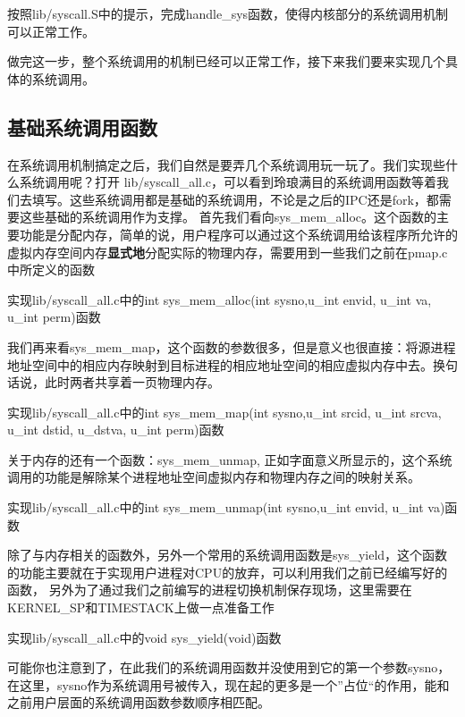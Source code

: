 \begin{exercise}
按照lib/syscall.S中的提示，完成handle\_sys函数，使得内核部分的系统调用机制可以正常工作。
\end{exercise}

做完这一步，整个系统调用的机制已经可以正常工作，接下来我们要来实现几个具体的系统调用。

\subsection{基础系统调用函数}

在系统调用机制搞定之后，我们自然是要弄几个系统调用玩一玩了。我们实现些什么系统调用呢？打开 lib/syscall\_all.c，可以看到玲琅满目的系统调用函数等着我们去填写。这些系统调用都是基础的系统调用，不论是之后的IPC还是fork，都需要这些基础的系统调用作为支撑。
首先我们看向sys\_mem\_alloc。这个函数的主要功能是分配内存，简单的说，用户程序可以通过这个系统调用给该程序所允许的虚拟内存空间内存\textbf{显式地}分配实际的物理内存，需要用到一些我们之前在pmap.c中所定义的函数
\begin{exercise}
实现lib/syscall\_all.c中的int sys\_mem\_alloc(int sysno,u\_int envid, u\_int va, u\_int perm)函数
\end{exercise}
我们再来看sys\_mem\_map，这个函数的参数很多，但是意义也很直接：将源进程地址空间中的相应内存映射到目标进程的相应地址空间的相应虚拟内存中去。换句话说，此时两者共享着一页物理内存。
\begin{exercise}
实现lib/syscall\_all.c中的int sys\_mem\_map(int sysno,u\_int srcid, u\_int srcva, u\_int dstid, u\_dstva, u\_int perm)函数
\end{exercise}
关于内存的还有一个函数：sys\_mem\_unmap, 正如字面意义所显示的，这个系统调用的功能是解除某个进程地址空间虚拟内存和物理内存之间的映射关系。
\begin{exercise}
实现lib/syscall\_all.c中的int sys\_mem\_unmap(int sysno,u\_int envid, u\_int va)函数
\end{exercise}
除了与内存相关的函数外，另外一个常用的系统调用函数是sys\_yield，这个函数的功能主要就在于实现用户进程对CPU的放弃，可以利用我们之前已经编写好的函数，
另外为了通过我们之前编写的进程切换机制保存现场，这里需要在KERNEL\_SP和TIMESTACK上做一点准备工作
\begin{exercise}
实现lib/syscall\_all.c中的void sys\_yield(void)函数
\end{exercise}
可能你也注意到了，在此我们的系统调用函数并没使用到它的第一个参数sysno，在这里，sysno作为系统调用号被传入，现在起的更多是一个”占位“的作用，能和之前用户层面的系统调用函数参数顺序相匹配。
